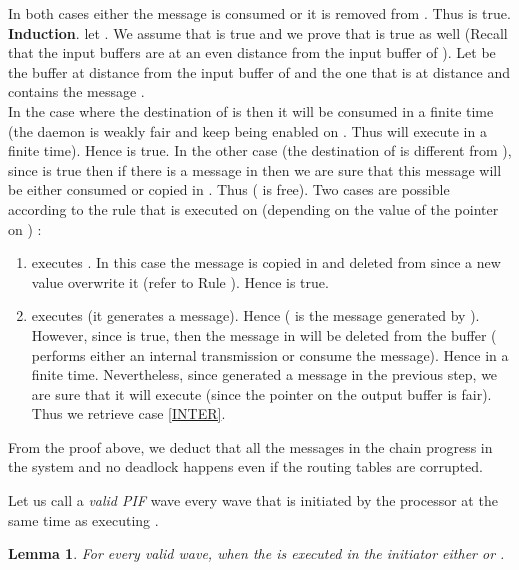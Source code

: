 \documentclass{llncs}
\renewenvironment{proof}{{\it Proof. } }{{\hfill }\vspace{.5pc}}
\newtheorem{lem}{Lemma}
\begin{document}
\begin{proof}
\begin{itemize}
\end{itemize}
 
In both cases either the message is consumed or it is removed from . Thus  is true.\\ 

\textbf{Induction}. let   . We assume that  is true and we prove that  is true as well (Recall that the input buffers are at an even distance from the input buffer of ). Let  be the buffer at distance  from the input buffer of  and  the one that is at distance  and contains the message . \\
In the case where the destination of  is  then it will be consumed in a finite time (the daemon is weakly fair and  keep being enabled on . Thus  will execute  in a finite time). Hence  is true. In the other case (the destination of  is different from ), since  is true then if there is a message  in  then we are sure that this message will be either consumed or copied in . Thus  ( is free). Two cases are possible according to the rule that is executed on  (depending on the value of the pointer on ) :
\begin{enumerate}
\item\label{INTER}{ executes . In this case the message  is copied in  and deleted from  since a new value overwrite it (refer to Rule ). Hence  is true.}
\item{ executes  (it generates a message). Hence  ( is the message generated by ). However, since  is true, then the message in  will be deleted from the buffer ( performs either an internal transmission or consume the message). Hence  in a finite time. Nevertheless, since  generated a message in the previous step, we are sure that it will execute  (since the pointer on the output buffer  is fair). Thus we retrieve case \ref{INTER}.}
\end{enumerate}

From the proof above, we deduct that all the messages in the chain progress in the system and no deadlock happens even if the routing tables are corrupted.

\end{proof}

Let us call a {\em valid PIF} wave every  wave that is initiated by the processor  at the same time as executing .

\begin{lem}\label{VPIF}
For every valid  wave, when the  is executed in the initiator either  or . 
\end{lem}
\end{document}
